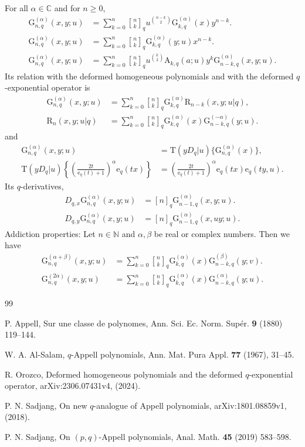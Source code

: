 \documentclass[12pt]{article}
\newcommand{\qbinom}{\genfrac{[}{]}{0pt}{}}
\newcommand{\C}{\mathbb{C}}
\newcommand{\N}{\mathbb{N}}
\newcommand{\e}{\mathrm{e}}
\newcommand{\AAA}{\mathrm{A}}
\newcommand{\G}{\mathrm{G}}
\newcommand{\rr}{\mathrm{R}}
\newcommand{\T}{\mathrm{T}}
\begin{document}
For all $\alpha\in\C$ and for $n\geq0$,
    \begin{align}
        \G_{n,q}^{(\alpha)}(x,y;u)&=\sum_{k=0}^{n}\qbinom{n}{k}_{q}u^{\binom{n-k}{2}}\G_{k,q}^{(\alpha)}(x)y^{n-k}.\\
        \G_{n,q}^{(\alpha)}(x,y;u)&=\sum_{k=0}^{n}\qbinom{n}{k}_{q}\G_{k,q}^{(\alpha)}(y;u)x^{n-k}.\\
        \G_{n,q}^{(\alpha)}(x,y;u)&=\sum_{k=0}^{n}\qbinom{n}{k}_{q}u^{\binom{k}{2}}\AAA_{k,q}(a;u)y^{k}\G_{n-k,q}^{(\alpha)}(x,y;u).
    \end{align}
Its relation with the deformed homogeneous polynomials and with the deformed $q$-exponential operator is
\begin{align}
        \G_{n,q}^{(\alpha)}(x,y;u)&=\sum_{k=0}^{n}\qbinom{n}{k}_{q}\G_{k,q}^{(\alpha)}\rr_{n-k}(x,y;u|q),\\
        \rr_{n}(x,y;u|q)&=\sum_{k=0}^{n}\qbinom{n}{k}_{q}\G_{k,q}^{(\alpha)}(x)\G_{n-k,q}^{(-\alpha)}(y;u).
    \end{align}
and
\begin{align}
        \G_{n,q}^{(\alpha)}(x,y;u)&=\T(yD_{q}|u)\{\G_{n,q}^{(\alpha)}(x)\},\\
        \T(yD_{q}|u)\left\{\left(\frac{2t}{\e_{q}(t)+1}\right)^{\alpha}\e_{q}(tx)\right\}&=\left(\frac{2t}{\e_{q}(t)+1}\right)^{\alpha}\e_{q}(tx)\e_{q}(ty,u).
    \end{align}
Its $q$-derivatives,
\begin{align}
        D_{q,x}\G_{n,q}^{(\alpha)}(x,y;u)&=[n]_{q}\G_{n-1,q}^{(\alpha)}(x,y;u).\\
        D_{q,y}\G_{n,q}^{(\alpha)}(x,y;u)&=[n]_{q}\G_{n-1,q}^{(\alpha)}(x,uy;u).
    \end{align}
Addiction properties:
Let $n\in\N$ and $\alpha,\beta$ be real or complex numbers. Then we have
    \begin{align}
        \G_{n,q}^{(\alpha+\beta)}(x,y;u)&=\sum_{k=0}^{n}\qbinom{n}{k}_{q}\G_{k,q}^{(\alpha)}(x)\G_{n-k,q}^{(\beta)}(y;v).\\
        \G_{n,q}^{(2\alpha)}(x,y;u)&=\sum_{k=0}^{n}\qbinom{n}{k}_{q}\G_{k,q}^{(\alpha)}(x)\G_{n-k,q}^{(\alpha)}(y;u).
    \end{align}



\begin{thebibliography}{99}

P. Appell, 
Sur une classe de polynomes, 
Ann. Sci. Ec. Norm. Supér. 
\textbf{9} (1880) 119--144.

W. A. Al-Salam, 
$q$-Appell polynomials, 
Ann. Mat. Pura Appl. 
\textbf{77} (1967), 31--45.

R. Orozco, 
Deformed homogeneous polynomials and the deformed $q$-exponential operator, 
arXiv:2306.07431v4, 
(2024).

P. N. Sadjang, 
On new $q$-analogue of Appell polynomials, 
arXiv:1801.08859v1, 
(2018).

P. N. Sadjang, 
On $(p,q)$-Appell polynomials, 
Anal. Math. 
\textbf{45} (2019) 583--598.



\end{thebibliography}
\end{document}
